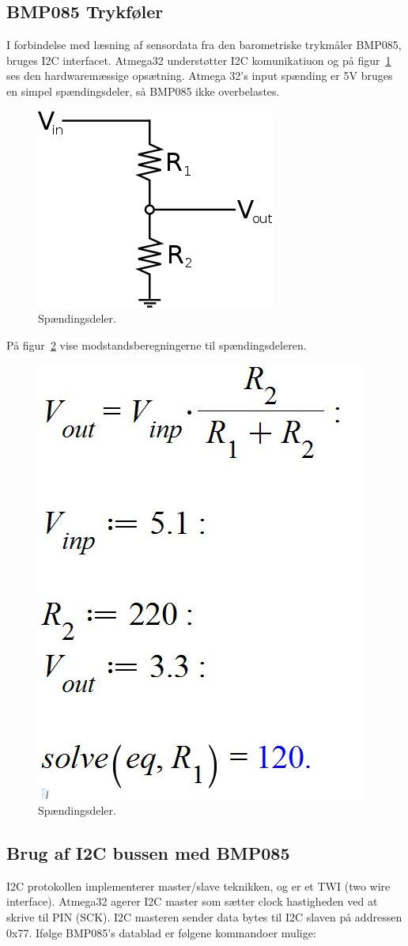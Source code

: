 \subsection{BMP085 Trykføler}

I forbindelse med læsning af sensordata fra den barometriske trykmåler BMP085, bruges I2C interfacet. Atmega32 understøtter I2C komunikatiuon og på figur~\ref{fig:voltagedivider} ses den hardwaremæssige opsætning. Atmega 32’s input spænding er 5V bruges en simpel spændingsdeler, så BMP085 ikke overbelastes.


\begin{figure}[h]
	\centering
	\includegraphics[width=0.4\linewidth]{figs/voltage_divider}
	\caption{Spændingsdeler.}
	\label{fig:voltagedivider}
\end{figure}

På figur~\ref{fig:voltagediv} vise modstandsberegningerne til spændingsdeleren.



\begin{figure}[h]
	\centering
	\includegraphics[width=0.3\linewidth]{figs/voltage_div}
	\caption{Spændingsdeler.}
	\label{fig:voltagediv}
\end{figure}

\subsection{Brug af I2C bussen med BMP085}

I2C protokollen implementerer master/slave teknikken, og er et TWI (two wire interface). 
Atmega32 agerer I2C master som sætter clock hastigheden ved at skrive til PIN (SCK). I2C masteren sender data bytes til I2C slaven på addressen 0x77.
Ifølge BMP085’s datablad er følgene kommandoer mulige:


